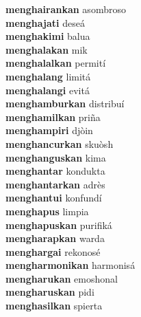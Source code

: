 \textbf{menghairankan } asombroso \\
\textbf{menghajati } deseá \\
\textbf{menghakimi } balua \\
\textbf{menghalakan } mik \\
\textbf{menghalalkan } permití \\
\textbf{menghalang } limitá \\
\textbf{menghalangi } evitá \\
\textbf{menghamburkan } distribuí \\
\textbf{menghamilkan } priña \\
\textbf{menghampiri } djòin \\
\textbf{menghancurkan } skuòsh \\
\textbf{menghanguskan } kima \\
\textbf{menghantar } kondukta \\
\textbf{menghantarkan } adrès \\
\textbf{menghantui } konfundí \\
\textbf{menghapus } limpia \\
\textbf{menghapuskan } purifiká \\
\textbf{mengharapkan } warda \\
\textbf{menghargai } rekonosé \\
\textbf{mengharmonikan } harmonisá \\
\textbf{mengharukan } emoshonal \\
\textbf{mengharuskan } pidi \\
\textbf{menghasilkan } spierta \\

